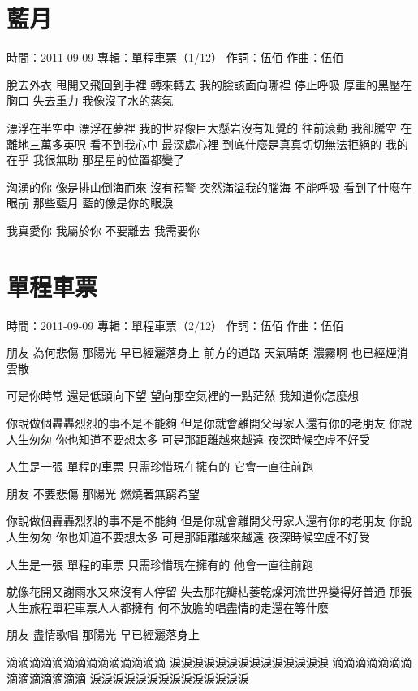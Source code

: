 \documentclass[UTF8,a4paper,oneside,twocolumn,12pt]{ctexbook}
\newcommand{\infopair}[2]{\textbullet #1：#2}
\newcommand{\zc}[1][伍佰]{\infopair{作詞}{#1}}
\newcommand{\zq}[1][伍佰]{\infopair{作曲}{#1}}
\newcommand{\zj}[1]{\infopair{專輯}{#1}}
\newcommand{\sj}[1]{\infopair{時間}{#1}}
\newenvironment{info}{\begin{flushleft}\kaishu
	}
	{\end{flushleft}\normalsize\yahei\par}
\newenvironment{lyric}{
	}
{}
\begin{document}
\section{藍月}
\begin{info}
	\sj{2011-09-09}
	\zj{單程車票（1/12）}
	\zc
	\zq
\end{info}
\begin{lyric}
	脫去外衣 甩開又飛回到手裡
	轉來轉去 我的臉該面向哪裡
	停止呼吸 厚重的黑壓在胸口
	失去重力 我像沒了水的蒸氣

	漂浮在半空中 漂浮在夢裡
	我的世界像巨大懸岩沒有知覺的
	往前滾動 我卻騰空
	在離地三萬多英呎
	看不到我心中 最深處心裡
	到底什麼是真真切切無法拒絕的
	我的在乎 我很無助
	那星星的位置都變了

	洶湧的你 像是排山倒海而來
	沒有預警 突然滿溢我的腦海
	不能呼吸 看到了什麼在眼前
	那些藍月 藍的像是你的眼淚

	我真愛你 我屬於你
	不要離去 我需要你
\end{lyric}

\section{單程車票}
\begin{info}
	\sj{2011-09-09}
	\zj{單程車票（2/12）}
	\zc
	\zq
\end{info}
\begin{lyric}
	朋友 為何悲傷
	那陽光 早已經灑落身上
	前方的道路 天氣晴朗
	濃霧啊 也已經煙消雲散

	可是你時常 還是低頭向下望
	望向那空氣裡的一點茫然 我知道你怎麼想

	你說做個轟轟烈烈的事不是不能夠
	但是你就會離開父母家人還有你的老朋友
	你說人生匆匆 你也知道不要想太多
	可是那距離越來越遠 夜深時候空虛不好受

	人生是一張 單程的車票
	只需珍惜現在擁有的 它會一直往前跑

	朋友 不要悲傷
	那陽光 燃燒著無窮希望

	你說做個轟轟烈烈的事不是不能夠
	但是你就會離開父母家人還有你的老朋友
	你說人生匆匆 你也知道不要想太多
	可是那距離越來越遠 夜深時候空虛不好受

	人生是一張 單程的車票
	只需珍惜現在擁有的 他會一直往前跑

	就像花開又謝雨水又來沒有人停留
	失去那花瓣枯萎乾燥河流世界變得好普通
	那張人生旅程單程車票人人都擁有
	何不放膽的唱盡情的走還在等什麼

	朋友 盡情歌唱
	那陽光 早已經灑落身上

	滴滴滴滴滴滴滴滴滴滴滴滴滴滴
	淚淚淚淚淚淚淚淚淚淚淚淚淚淚
	滴滴滴滴滴滴滴滴滴滴滴滴滴滴
	淚淚淚淚淚淚淚淚淚淚淚淚淚淚
\end{lyric}
\end{document}
